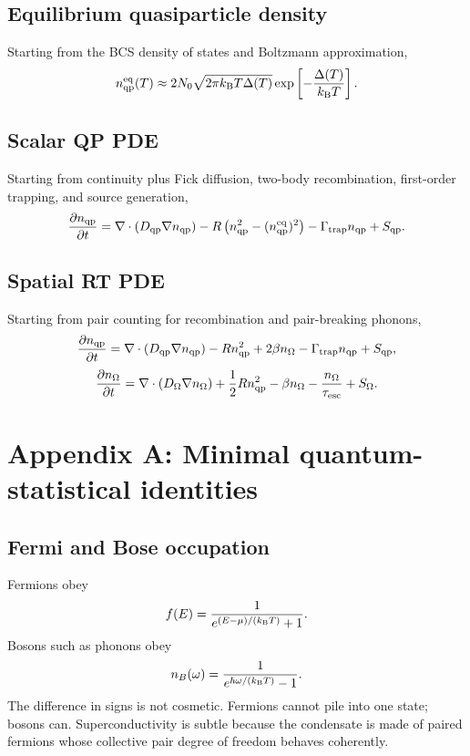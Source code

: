 \documentclass[11pt]{article}
\newcommand{\esc}{\mathrm{esc}}
\newcommand{\trap}{\mathrm{trap}}
\newcommand{\eq}{\mathrm{eq}}
\begin{document}
\subsection{Equilibrium quasiparticle density}
Starting from the BCS density of states and Boltzmann approximation,
\begin{equation}
 n_{\qp}^{\eq}(T)\approx 2N_0\sqrt{2\pi\kB T\Delta(T)}\exp\left[-\frac{\Delta(T)}{\kB T}\right].
\end{equation}

\subsection{Scalar QP PDE}
Starting from continuity plus Fick diffusion, two-body recombination, first-order trapping, and source generation,
\begin{equation}
\frac{\partial n_{\qp}}{\partial t}
=\nabla\cdot(D_{\qp}\nabla n_{\qp})
-R\left(n_{\qp}^2-(n_{\qp}^{\eq})^2\right)
-\Gamma_{\trap}n_{\qp}+S_{\qp}.
\end{equation}

\subsection{Spatial RT PDE}
Starting from pair counting for recombination and pair-breaking phonons,
\begin{equation}
\frac{\partial n_{\qp}}{\partial t}
=\nabla\cdot(D_{\qp}\nabla n_{\qp})-R n_{\qp}^2+2\beta n_{\Omega}-\Gamma_{\trap}n_{\qp}+S_{\qp},
\end{equation}
\begin{equation}
\frac{\partial n_{\Omega}}{\partial t}
=\nabla\cdot(D_{\Omega}\nabla n_{\Omega})+\frac{1}{2}R n_{\qp}^2-\beta n_{\Omega}-\frac{n_{\Omega}}{\tau_{\esc}}+S_{\Omega}.
\end{equation}

\section{Appendix A: Minimal quantum-statistical identities}

\subsection{Fermi and Bose occupation}
Fermions obey
\begin{equation}
 f(E)=\frac{1}{e^{(E-\mu)/(k_{\mathrm{B}} T)}+1}.
\end{equation}
Bosons such as phonons obey
\begin{equation}
 n_B(\omega)=\frac{1}{e^{\hbar\omega/(k_{\mathrm{B}} T)}-1}.
\end{equation}
The difference in signs is not cosmetic. Fermions cannot pile into one state; bosons can. Superconductivity is subtle because the condensate is made of paired fermions whose collective pair degree of freedom behaves coherently.
\end{document}
